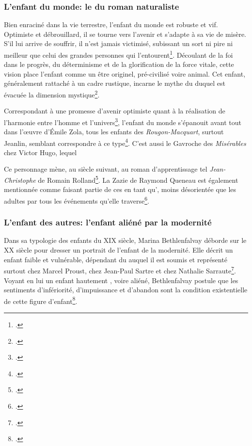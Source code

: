 \subsubsection{L'enfant du monde: le  du roman naturaliste}
Bien enraciné dans la vie terrestre, l'enfant du monde est robuste et vif. Optimiste et débrouillard, il se tourne vers l'avenir et s'adapte à sa vie de misère.
S'il lui arrive de souffrir, il n'est jamais victimisé, subissant un sort ni pire ni meilleur que celui des grandes personnes qui l'entourent\footcite[85-86]{Bethlenfalvay1979}.
Découlant de la foi dans le progrès, du déterminisme et de la glorification de la force vitale, cette vision place l'enfant comme un être originel, pré-civilisé voire animal. Cet enfant, généralement rattaché à un cadre rustique, incarne le mythe du  duquel est évacuée la dimension mystique\footcite[85, 87-88, 92]{Bethlenfalvay1979}.
\par
Correspondant à une promesse d'avenir optimiste quant à la réalisation de l'harmonie entre l'homme et l'univers\footcite[92]{Bethlenfalvay1979}, l'enfant du monde s'épanouit avant tout dans l'\oe{}uvre d'Émile Zola, tous les enfants des \textit{Rougon-Macquart}, surtout Jeanlin, semblant correspondre à ce type\footcite[85-89]{Bethlenfalvay1979}.
C'est aussi le Gavroche des \textit{Misérables} chez Victor Hugo, lequel 
\par
Ce personnage mène, au siècle suivant, au roman d'apprentissage tel \textit{Jean-Christophe} de Romain Rolland\footcite[112]{Bethlenfalvay1979}.
La Zazie de Raymond Queneau est également mentionnée comme faisant partie de ces  en tant qu', moins désorientée que les adultes par tous les événements qu'elle traverse\footcite[117]{Bethlenfalvay1979}.

\subsubsection{L'enfant des autres: l'enfant aliéné par la modernité}
Dans sa typologie des enfants du XIX siècle, Marina Bethlenfalvay déborde sur le XX siècle pour dresser un portrait de l'enfant de la modernité.
Elle décrit un enfant faible et vulnérable, dépendant du  auquel il est soumis et représenté surtout chez Marcel Proust, chez Jean-Paul Sartre et chez Nathalie Sarraute\footcite[128-129]{Bethlenfalvay1979}.
Voyant en lui un enfant hautement , voire aliéné,
Bethlenfalvay postule que les sentiments d'infériorité, d'impuissance et d'abandon sont la condition existentielle de cette figure d'enfant\footcite[128, 134-135, 138]{Bethlenfalvay1979}.


